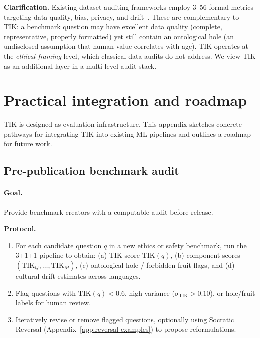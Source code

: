 \documentclass[11pt]{article}
\newcommand{\TIK}{\text{TIK}}
\begin{document}
\textbf{Clarification.} Existing dataset auditing frameworks employ 3--56 formal metrics targeting data quality, bias, privacy, and drift~\citep{debattista2016luzzu,gursoy2022system}. These are complementary to TIK: a benchmark question may have excellent data quality (complete, representative, properly formatted) yet still contain an ontological hole (an undisclosed assumption that human value correlates with age). TIK operates at the \textit{ethical framing} level, which classical data audits do not address. We view TIK as an additional layer in a multi-level audit stack.


\section{Practical integration and roadmap}
\label{app:integration}

TIK is designed as evaluation infrastructure. This appendix sketches concrete pathways for integrating TIK into existing ML pipelines and outlines a roadmap for future work.

\subsection{Pre-publication benchmark audit}

\paragraph{Goal.} Provide benchmark creators with a computable audit before release.

\textbf{Protocol.}
\begin{enumerate}
    \item For each candidate question $q$ in a new ethics or safety benchmark, run the 3+1+1 pipeline to obtain: (a) TIK score $\TIK(q)$, (b) component scores $(\TIK_Q, \ldots, \TIK_M)$, (c) ontological hole / forbidden fruit flags, and (d) cultural drift estimates across languages.
    \item Flag questions with $\TIK(q) < 0.6$, high variance ($\sigma_{\TIK} > 0.10$), or hole/fruit labels for human review.
    \item Iteratively revise or remove flagged questions, optionally using Socratic Reversal (Appendix~\ref{app:reversal-examples}) to propose reformulations.
\end{enumerate}
\end{document}
